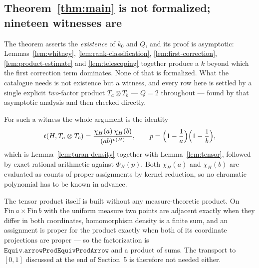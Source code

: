 \documentclass[11pt]{article}
\newcommand{\PhiH}{\Phi_H}
\begin{document}
\subsection*{Theorem~\ref{thm:main} is not formalized; nineteen witnesses are}

The theorem asserts the \emph{existence} of $k_0$ and $Q$, and its proof is
asymptotic: Lemmas~\ref{lem:whitney}, \ref{lem:rank-classification},
\ref{lem:first-correction}, \ref{lem:product-estimate} and
\ref{lem:telescoping} together produce a $k$ beyond which the first correction
term dominates.  None of that is formalized.  What the catalogue needs is not
existence but a witness, and every row here is settled by a single explicit
\emph{two}-factor product $T_a\otimes T_b$ --- $Q=2$ throughout --- found by
that asymptotic analysis and then checked directly.

For such a witness the whole argument is the identity
\[
 t(H,T_a\otimes T_b)=\frac{\chi_H(a)\,\chi_H(b)}{(ab)^{v(H)}},
 \qquad
 p=\Bigl(1-\frac1a\Bigr)\Bigl(1-\frac1b\Bigr),
\]
which is Lemma~\ref{lem:turan-density} together with Lemma~\ref{lem:tensor},
followed by exact rational arithmetic against $\PhiH(p)$.  Both $\chi_H(a)$ and
$\chi_H(b)$ are evaluated as counts of proper assignments by kernel reduction,
so no chromatic polynomial has to be known in advance.

The tensor product itself is built without any measure-theoretic product.  On
$\mathrm{Fin}\,a\times\mathrm{Fin}\,b$ with the uniform measure two points are
adjacent exactly when they differ in both coordinates, homomorphism density is
a finite sum, and an assignment is proper for the product exactly when both of
its coordinate projections are proper --- so the factorization is
$\mathtt{Equiv.arrowProdEquivProdArrow}$ and a product of sums.  The transport
to $[0,1]$ discussed at the end of Section~5 is therefore not needed either.
\end{document}
